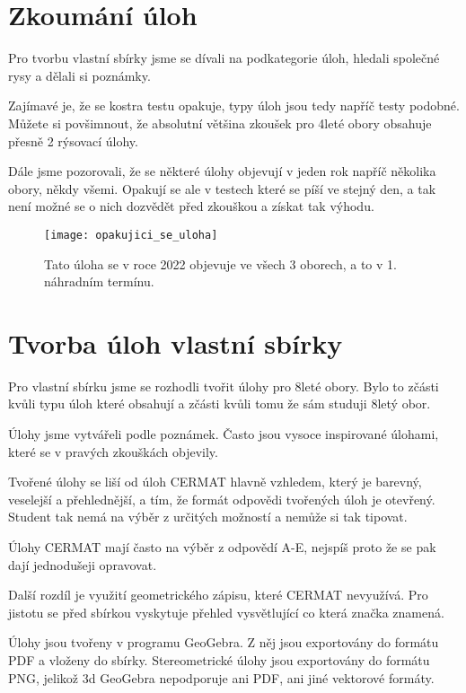 


\section{Zkoumání úloh}

Pro tvorbu vlastní sbírky jsme se dívali na podkategorie úloh, hledali společné rysy a dělali si poznámky.

Zajímavé je, že se kostra testu opakuje, typy úloh jsou tedy napříč testy podobné. Můžete si povšimnout, že absolutní většina zkoušek pro 4leté obory obsahuje přesně 2 rýsovací úlohy.

Dále jsme pozorovali, že se některé úlohy objevují v jeden rok napříč několika obory, někdy všemi. Opakují se ale v testech které se píší ve stejný den, a tak není možné se o nich dozvědět před zkouškou a získat tak výhodu.


\begin{figure}[h]
    \caption{Tato úloha se v roce 2022 objevuje ve všech 3 oborech, a to v 1. náhradním termínu.}
    \centering
    \texttt{[image: opakujici\_se\_uloha]}
\end{figure}


\section{Tvorba úloh vlastní sbírky}

Pro vlastní sbírku jsme se rozhodli tvořit úlohy pro 8leté obory. Bylo to zčásti kvůli typu úloh které obsahují a zčásti kvůli tomu že sám studuji 8letý obor.

Úlohy jsme vytvářeli podle poznámek. Často jsou vysoce inspirované úlohami, které se v pravých zkouškách objevily.

Tvořené úlohy se liší od úloh CERMAT hlavně vzhledem, který je barevný, veselejší a přehlednější, a tím, že formát odpovědi tvořených úloh je otevřený. Student tak nemá na výběr z určitých možností a nemůže si tak tipovat.

Úlohy CERMAT mají často na výběr z odpovědí A-E, nejspíš proto že se pak dají jednodušeji opravovat.

Další rozdíl je využití geometrického zápisu, které CERMAT nevyužívá. Pro jistotu se před sbírkou vyskytuje přehled vysvětlující co která značka znamená.

Úlohy jsou tvořeny v programu GeoGebra. Z něj jsou exportovány do formátu PDF a vloženy do sbírky. Stereometrické úlohy jsou exportovány do formátu PNG, jelikož 3d GeoGebra nepodporuje ani PDF, ani jiné vektorové formáty.
